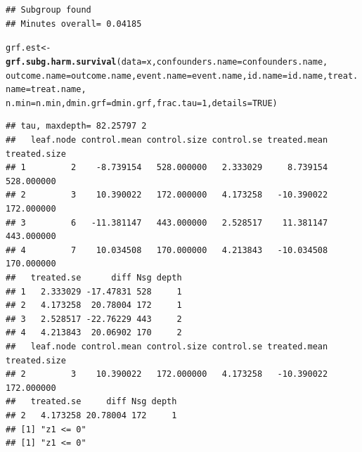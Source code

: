 \documentclass[smallextended]{svjour3}
\makeatletter
\newcommand{\hlnum}[1]{\textcolor[rgb]{0.686,0.059,0.569}{#1}}%
\newcommand{\hlstd}[1]{\textcolor[rgb]{0.345,0.345,0.345}{#1}}%
\newcommand{\hlkwb}[1]{\textcolor[rgb]{0.69,0.353,0.396}{#1}}%
\newcommand{\hlkwc}[1]{\textcolor[rgb]{0.333,0.667,0.333}{#1}}%
\newcommand{\hlkwd}[1]{\textcolor[rgb]{0.737,0.353,0.396}{\textbf{#1}}}%
\newenvironment{kframe}{%
 \def\at@end@of@kframe{}%
 \ifinner\ifhmode%
  \def\at@end@of@kframe{\end{minipage}}%
  \begin{minipage}{\columnwidth}%
 \fi\fi%
 \def\FrameCommand##1{\hskip\@totalleftmargin \hskip-\fboxsep
 \colorbox{shadecolor}{##1}\hskip-\fboxsep
     \hskip-\linewidth \hskip-\@totalleftmargin \hskip\columnwidth}%
 \MakeFramed {\advance\hsize-\width
   \@totalleftmargin\z@ \linewidth\hsize
   \@setminipage}}%
 {\par\unskip\endMakeFramed%
 \at@end@of@kframe}
\newenvironment{knitrout}{}{} %
\makeatother
\begin{document}
\begin{knitrout}
\begin{kframe}
\begin{verbatim}
## Subgroup found 
## Minutes overall= 0.04185
\end{verbatim}
\begin{alltt}
\hlstd{grf.est} \hlkwb{<-} \hlkwd{grf.subg.harm.survival}\hlstd{(}\hlkwc{data} \hlstd{= x,} \hlkwc{confounders.name} \hlstd{= confounders.name,}
    \hlkwc{outcome.name} \hlstd{= outcome.name,} \hlkwc{event.name} \hlstd{= event.name,} \hlkwc{id.name} \hlstd{= id.name,} \hlkwc{treat.name} \hlstd{= treat.name,}
    \hlkwc{n.min} \hlstd{= n.min,} \hlkwc{dmin.grf} \hlstd{= dmin.grf,} \hlkwc{frac.tau} \hlstd{=} \hlnum{1}\hlstd{,} \hlkwc{details} \hlstd{=} \hlnum{TRUE}\hlstd{)}
\end{alltt}
\begin{verbatim}
## tau, maxdepth= 82.25797 2 
##   leaf.node control.mean control.size control.se treated.mean treated.size
## 1         2    -8.739154   528.000000   2.333029     8.739154   528.000000
## 2         3    10.390022   172.000000   4.173258   -10.390022   172.000000
## 3         6   -11.381147   443.000000   2.528517    11.381147   443.000000
## 4         7    10.034508   170.000000   4.213843   -10.034508   170.000000
##   treated.se      diff Nsg depth
## 1   2.333029 -17.47831 528     1
## 2   4.173258  20.78004 172     1
## 3   2.528517 -22.76229 443     2
## 4   4.213843  20.06902 170     2
##   leaf.node control.mean control.size control.se treated.mean treated.size
## 2         3    10.390022   172.000000   4.173258   -10.390022   172.000000
##   treated.se     diff Nsg depth
## 2   4.173258 20.78004 172     1
## [1] "z1 <= 0"
## [1] "z1 <= 0"
\end{verbatim}
\end{kframe}
\end{knitrout}
\end{document}
